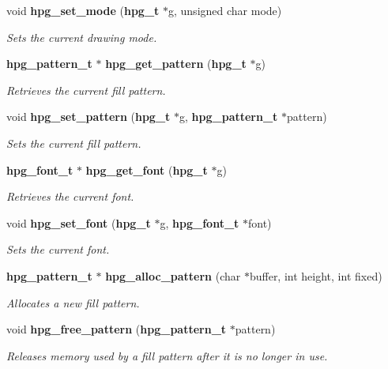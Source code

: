 \begin{CompactItemize}
void {\bf hpg\_\-set\_\-mode} ({\bf hpg\_\-t} $\ast$g, unsigned char mode)
\begin{CompactList}\small\item\em Sets the current drawing mode.\item\end{CompactList}\item 
{\bf hpg\_\-pattern\_\-t} $\ast$ {\bf hpg\_\-get\_\-pattern} ({\bf hpg\_\-t} $\ast$g)
\begin{CompactList}\small\item\em Retrieves the current fill pattern.\item\end{CompactList}\item 
void {\bf hpg\_\-set\_\-pattern} ({\bf hpg\_\-t} $\ast$g, {\bf hpg\_\-pattern\_\-t} $\ast$pattern)
\begin{CompactList}\small\item\em Sets the current fill pattern.\item\end{CompactList}\item 
{\bf hpg\_\-font\_\-t} $\ast$ {\bf hpg\_\-get\_\-font} ({\bf hpg\_\-t} $\ast$g)
\begin{CompactList}\small\item\em Retrieves the current font.\item\end{CompactList}\item 
void {\bf hpg\_\-set\_\-font} ({\bf hpg\_\-t} $\ast$g, {\bf hpg\_\-font\_\-t} $\ast$font)
\begin{CompactList}\small\item\em Sets the current font.\item\end{CompactList}\item 
{\bf hpg\_\-pattern\_\-t} $\ast$ {\bf hpg\_\-alloc\_\-pattern} (char $\ast$buffer, int height, int fixed)
\begin{CompactList}\small\item\em Allocates a new fill pattern.\item\end{CompactList}\item 
void {\bf hpg\_\-free\_\-pattern} ({\bf hpg\_\-pattern\_\-t} $\ast$pattern)
\begin{CompactList}\small\item\em Releases memory used by a fill pattern after it is no longer in use.\item\end{CompactList}\item 

\end{CompactItemize}
